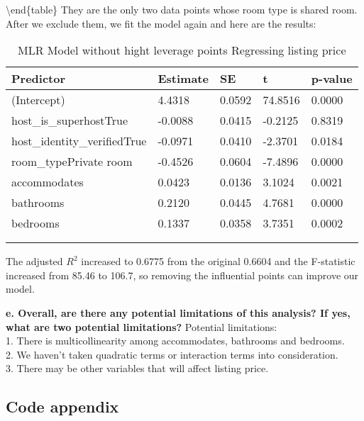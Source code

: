 \documentclass[
]{article}
\begin{document}
\textbackslash end\{table\} They are the only two data points whose room
type is shared room.\\
After we exclude them, we fit the model again and here are the results:~

\begin{table}[!h]

\caption{\label{tab:unnamed-chunk-22}MLR Model without hight leverage points Regressing listing price}
\centering
\begin{tabu} to 
\hline
Predictor & Estimate & SE & t & p-value\\
\hline
(Intercept) & 4.4318 & 0.0592 & 74.8516 & 0.0000\\
\hline
host\_is\_superhostTrue & -0.0088 & 0.0415 & -0.2125 & 0.8319\\
\hline
host\_identity\_verifiedTrue & -0.0971 & 0.0410 & -2.3701 & 0.0184\\
\hline
room\_typePrivate room & -0.4526 & 0.0604 & -7.4896 & 0.0000\\
\hline
accommodates & 0.0423 & 0.0136 & 3.1024 & 0.0021\\
\hline
bathrooms & 0.2120 & 0.0445 & 4.7681 & 0.0000\\
\hline
bedrooms & 0.1337 & 0.0358 & 3.7351 & 0.0002\\
\hline
{}\\
\\
\end{tabu}
\end{table}

The adjusted \(R^2\) increased to 0.6775 from the original 0.6604 and
the F-statistic increased from 85.46 to 106.7, so removing the
influential points can improve our model.

\textbf{e. Overall, are there any potential limitations of this
analysis? If yes, what are two potential limitations?} Potential
limitations:\\
1. There is multicollinearity among accommodates, bathrooms and
bedrooms.\\
2. We haven't taken quadratic terms or interaction terms into
consideration.\\
3. There may be other variables that will affect listing price.

\newpage

\hypertarget{code-appendix}{%
\subsection{Code appendix}\label{code-appendix}}
\end{document}
